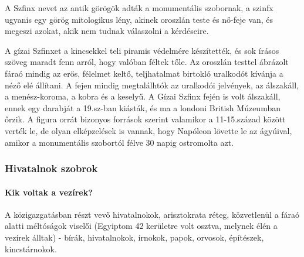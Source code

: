 	A Szfinx nevet az antik görögök adták a monumentális szobornak, a szinfx ugyanis egy görög mitologikus lény, akinek oroszlán teste és nő-feje van, és megeszi azokat, akik nem tudnak válaszolni a kérdéseire.
	
	A gízai Szfinxet a kincsekkel teli piramis védelmére készítették, és sok írásos szöveg maradt fenn arról, hogy valóban féltek tőle. Az oroszlán testtel ábrázolt fáraó mindig az erős, félelmet keltő, teljhatalmat birtokló uralkodót kívánja a néző elé állítani. A fejen mindig megtalálhtók az uralkodói jelvények, az álszakáll, a menész-koroma, a kobra és a keselyű. A Gízai Szfinx fején is volt álszakáll, ennek egy darabját a 19.sz-ban kiásták, és ma a londoni British Múzeumban őrzik. A figura orrát bizonyos források szerint valamikor a 11-15.század között verték le, de olyan elképzelések is vannak, hogy Napóleon lövette le az ágyúival, amikor a monumentális szobortól félve 30 napig ostromolta azt.
	
	\begin{figure}[H]
		\centering
		\captionsetup{labelformat=empty}
		\caption{}
	\end{figure}
	
\subsubsection*{Hivatalnok szobrok}

\paragraph{Kik voltak a vezírek?}
A közigazgatásban részt vevő hivatalnokok, arisztokrata réteg, közvetlenül a fáraó alatti méltóságok viselői (Egyiptom 42 kerületre volt osztva, melynek élén a vezírek álltak) - bírák, hivatalnokok, írnokok, papok, orvosok, építészek, kincstárnokok.

